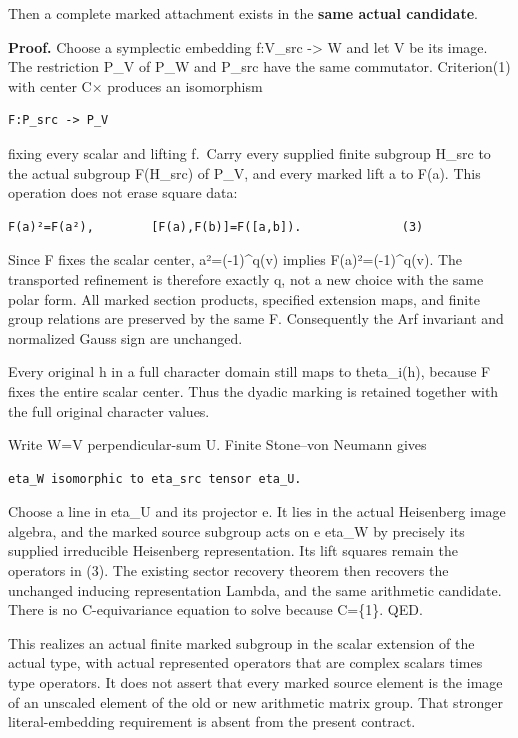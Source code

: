 Then a complete marked attachment exists in the \textbf{same actual
candidate}.

\textbf{Proof.} Choose a symplectic embedding f:V\_src -\textgreater{} W
and let V be its image. The restriction P\_V of P\_W and P\_src have the
same commutator. Criterion(1) with center C× produces an isomorphism

\begin{Verbatim}[fontsize=\small,breaklines=true,breakanywhere=true]
F:P_src -> P_V
\end{Verbatim}

fixing every scalar and lifting f.~Carry every supplied finite subgroup
H\_src to the actual subgroup F(H\_src) of P\_V, and every marked lift a
to F(a). This operation does not erase square data:

\begin{Verbatim}[fontsize=\small,breaklines=true,breakanywhere=true]
F(a)²=F(a²),        [F(a),F(b)]=F([a,b]).              (3)
\end{Verbatim}

Since F fixes the scalar center, a²=(-1)\^{}q(v) implies
F(a)²=(-1)\^{}q(v). The transported refinement is therefore exactly q,
not a new choice with the same polar form. All marked section products,
specified extension maps, and finite group relations are preserved by
the same F. Consequently the Arf invariant and normalized Gauss sign are
unchanged.

Every original h in a full character domain still maps to theta\_i(h),
because F fixes the entire scalar center. Thus the dyadic marking is
retained together with the full original character values.

Write W=V perpendicular-sum U. Finite Stone--von Neumann gives

\begin{Verbatim}[fontsize=\small,breaklines=true,breakanywhere=true]
eta_W isomorphic to eta_src tensor eta_U.
\end{Verbatim}

Choose a line in eta\_U and its projector e. It lies in the actual
Heisenberg image algebra, and the marked source subgroup acts on e
eta\_W by precisely its supplied irreducible Heisenberg representation.
Its lift squares remain the operators in (3). The existing sector
recovery theorem then recovers the unchanged inducing representation
Lambda, and the same arithmetic candidate. There is no C-equivariance
equation to solve because C=\{1\}. QED.

This realizes an actual finite marked subgroup in the scalar extension
of the actual type, with actual represented operators that are complex
scalars times type operators. It does not assert that every marked
source element is the image of an unscaled element of the old or new
arithmetic matrix group. That stronger literal-embedding requirement is
absent from the present contract.

